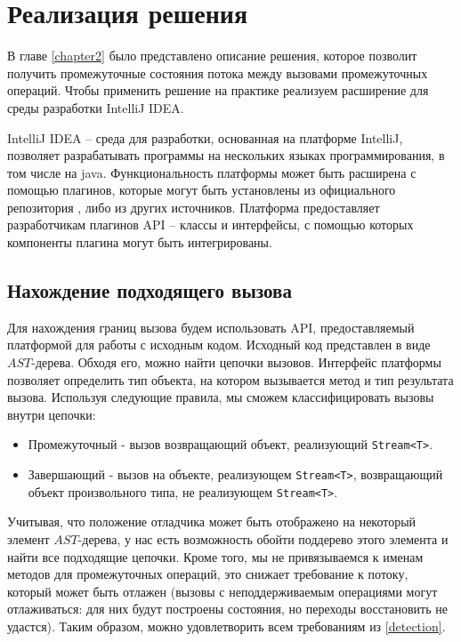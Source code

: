 \section{Реализация решения}\label{chapter3}

В главе \ref{chapter2} было представлено описание решения, которое позволит получить промежуточные состояния потока между вызовами промежуточных операций. Чтобы применить решение на практике реализуем расширение для среды разработки IntelliJ IDEA. 

IntelliJ IDEA -- среда для разработки, основанная на платформе IntelliJ, позволяет разрабатывать программы на нескольких языках программирования, в том числе на java. Функциональность платформы может быть расширена с помощью плагинов, которые могут быть установлены из официального репозитория \cite{jb:plugins}, либо из других источников. Платформа предоставляет разработчикам плагинов API -- классы и интерфейсы, с помощью которых компоненты плагина могут быть интегрированы.
\subsection{Нахождение подходящего вызова}

Для нахождения границ вызова будем использовать API, предоставляемый платформой для работы с исходным кодом. Исходный код представлен в виде $AST$-дерева. Обходя его, можно найти цепочки вызовов. Интерфейс платформы позволяет определить тип объекта, на котором вызывается метод и тип результата вызова. Используя следующие правила, мы сможем классифицировать вызовы внутри цепочки:
\begin{itemize}
	\item Промежуточный - вызов возвращающий объект, реализующий \texttt{Stream<T>}.
	\item Завершающий - вызов на объекте, реализующем \texttt{Stream<T>}, возвращающий объект произвольного типа, не реализующем \texttt{Stream<T>}. 
\end{itemize}

Учитывая, что положение отладчика может быть отображено на некоторый элемент $AST$-дерева, у нас есть возможность обойти поддерево этого элемента и найти все подходящие цепочки. Кроме того, мы не привязываемся к именам методов для промежуточных операций, это снижает требование к потоку, который может быть отлажен (вызовы с неподдерживаемым операциями могут отлаживаться: для них будут построены состояния, но переходы восстановить не удастся). Таким образом, можно удовлетворить всем требованиям из \ref{detection}.


